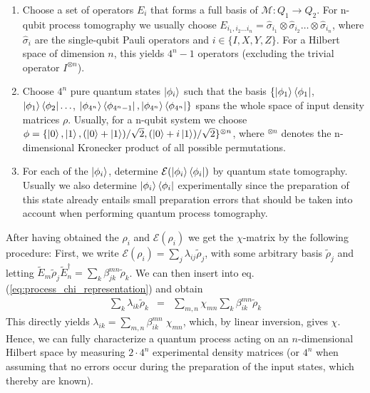 \begin{enumerate}
\item Choose a set of operators $E_i$ that forms a full basis of $\mathcal{M}: Q_1 \to Q_2$. For n-qubit process tomography we usually choose $E_{i_1,i_2 \hdots i_n} = \hat{\sigma}_{i_1}\otimes \hat{\sigma}_{i_2}\hdots\otimes\hat{\sigma}_{i_n}$, where $\hat{\sigma}_i$ are the single-qubit Pauli operators and $i\in\{I,X,Y,Z\}$. For a Hilbert space of dimension $n$, this yields $4^n-1$ operators (excluding the trivial operator $I^{\otimes n}$).
\item Choose $4^n$ pure quantum states $\left| \phi_i \right>$ such that the basis $\{\left| \phi_1 \right>\left< \phi_1 \right|$, $\left| \phi_1 \right>\left< \phi_2 \right|\hdots$, $\left| \phi_{4^n} \right>\left< \phi_{4^n-1} \right|,\left| \phi_{4^n} \right>\left< \phi_{4^n} \right|\}$ spans the whole space of input density matrices $\rho$. Usually, for a n-qubit system we choose $\phi = \{\left| 0 \right>,\left| 1 \right>,(\left| 0 \right>+\left| 1 \right>)/\sqrt{2},(\left| 0 \right>+i\left| 1 \right>)/\sqrt{2}\}^{\otimes n}$, where $^{\otimes n}$ denotes the n-dimensional Kronecker product of all possible permutations.
\item For each of the $\left| \phi_i \right>$, determine $\mathcal{E}(\left| \phi_i \right>\left< \phi_i \right|)$ by quantum state tomography. Usually we also determine $\left| \phi_i \right>\left< \phi_i \right|$ experimentally since the preparation of this state already entails small preparation errors that should be taken into account when performing quantum process tomography. 
\end{enumerate}

After having obtained the $\rho_i$ and $\mathcal{E}(\rho_i)$ we get the $\chi$-matrix by the following procedure: First, we write $\mathcal{E}(\rho_i) = \sum_j \lambda_{ij} \tilde{\rho}_j$, with some arbitrary basis $\tilde{\rho}_j$ and
letting $\tilde{E}_m \tilde{\rho}_j \tilde{E}_n^\dagger = \sum_k \beta_{jk}^{mn}\tilde{\rho}_k$. We can then insert into eq. (\ref{eq:process_chi_representation}) and obtain
\begin{eqnarray}
\sum\limits_k \lambda_{ik} \tilde{\rho}_k & = & \sum\limits_{m,n} \chi_{mn} \sum\limits_k \beta_{ik}^{mn} \tilde{\rho}_k  
\end{eqnarray}
This directly yields $\lambda_{ik} = \sum_{m,n}\beta_{ik}^{mn}\; \chi_{mn}$, which, by linear inversion,  gives $\chi$. Hence, we can fully characterize a quantum process acting on an $n$-dimensional Hilbert space by measuring $2\cdot 4^n$ experimental density matrices (or $4^n$ when assuming that no errors occur during the preparation of the input states, which thereby are known).

